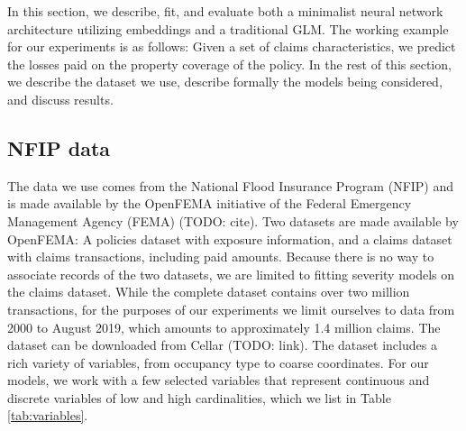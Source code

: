 \documentclass{article}
\begin{document}
In this section, we describe, fit, and evaluate both a minimalist neural
network architecture utilizing embeddings and a traditional GLM. The
working example for our experiments is as follows: Given a set of claims
characteristics, we predict the losses paid on the property coverage of
the policy. In the rest of this section, we describe the dataset we use,
describe formally the models being considered, and discuss results.

\hypertarget{nfip-data}{%
\subsection{NFIP data}\label{nfip-data}}

The data we use comes from the National Flood Insurance Program (NFIP)
and is made available by the OpenFEMA initiative of the Federal
Emergency Management Agency (FEMA) (TODO: cite). Two datasets are made
available by OpenFEMA: A policies dataset with exposure information, and
a claims dataset with claims transactions, including paid amounts.
Because there is no way to associate records of the two datasets, we are
limited to fitting severity models on the claims dataset. While the
complete dataset contains over two million transactions, for the
purposes of our experiments we limit ourselves to data from 2000 to
August 2019, which amounts to approximately 1.4 million claims. The
dataset can be downloaded from Cellar (TODO: link). The dataset includes
a rich variety of variables, from occupancy type to coarse coordinates.
For our models, we work with a few selected variables that represent
continuous and discrete variables of low and high cardinalities, which
we list in Table \ref{tab:variables}.
\end{document}
